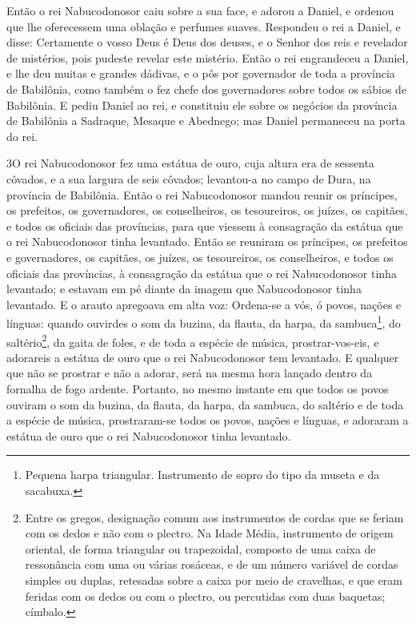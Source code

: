 Então o rei Nabucodonosor caiu sobre a sua face, e adorou a
Daniel, e ordenou que lhe oferecessem uma oblação e perfumes suaves.
Respondeu o rei a Daniel, e disse: Certamente o vosso Deus é
Deus dos deuses, e o Senhor dos reis e revelador de mistérios, pois
pudeste revelar este mistério. Então o rei engrandeceu a
Daniel, e lhe deu muitas e grandes dádivas, e o pôs por governador
de toda a província de Babilônia, como também o fez chefe dos
governadores sobre todos os sábios de Babilônia. E pediu
Daniel ao rei, e constituiu ele sobre os negócios da província de
Babilônia a Sadraque, Mesaque e Abednego; mas Daniel permaneceu na
porta do rei.

\medskip

\lettrine{3} O rei Nabucodonosor fez uma estátua de ouro, cuja
altura era de sessenta côvados, e a sua largura de seis côvados;
levantou-a no campo de Dura, na província de Babilônia. Então o
rei Nabucodonosor mandou reunir os príncipes, os prefeitos, os
governadores, os conselheiros, os tesoureiros, os juízes, os
capitães, e todos os oficiais das províncias, para que viessem à
consagração da estátua que o rei Nabucodonosor tinha levantado.
Então se reuniram os príncipes, os prefeitos e governadores, os
capitães, os juízes, os tesoureiros, os conselheiros, e todos os
oficiais das províncias, à consagração da estátua que o rei
Nabucodonosor tinha levantado; e estavam em pé diante da imagem que
Nabucodonosor tinha levantado. E o arauto apregoava em alta voz:
Ordena-se a vós, ó povos, nações e línguas: quando ouvirdes o
som da buzina, da flauta, da harpa, da sambuca\footnote{Pequena
harpa triangular. Instrumento de sopro do tipo da museta e da
sacabuxa.}, do saltério\footnote{Entre os gregos, designação comum
aos instrumentos de cordas que se feriam com os dedos e não com o
plectro. Na Idade Média, instrumento de origem oriental, de forma
triangular ou trapezoidal, composto de uma caixa de ressonância com
uma ou várias rosáceas, e de um número variável de cordas simples ou
duplas, retesadas sobre a caixa por meio de cravelhas, e que eram
feridas com os dedos ou com o plectro, ou percutidas com duas
baquetas; címbalo.}, da gaita de foles, e de toda a espécie de
música, prostrar-vos-eis, e adorareis a estátua de ouro que o rei
Nabucodonosor tem levantado. E qualquer que não se prostrar e
não a adorar, será na mesma hora lançado dentro da fornalha de fogo
ardente. Portanto, no mesmo instante em que todos os povos
ouviram o som da buzina, da flauta, da harpa, da sambuca, do
saltério e de toda a espécie de música, prostraram-se todos os
povos, nações e línguas, e adoraram a estátua de ouro que o rei
Nabucodonosor tinha levantado.

